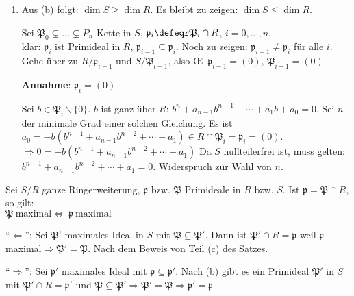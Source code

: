 \begin{Bew}
\begin{enumerate}
\item Aus (b) folgt: $\dim{S} \geq\dim{R}$. Es bleibt zu
zeigen: $\dim{S} \leq \dim{R}$.

Sei $\mathfrak{P}_0\subsetneq \ldots \subsetneq P_n$ Kette in $S$, 
$\mathfrak{p}_i\defeqr \mathfrak{P}_i\cap R$, $i=0,\ldots,n$.\\
klar: $\mathfrak{p}_i$ ist Primideal in $R$, $\mathfrak{p}_{i-1}\subseteq \mathfrak{p}_i$.
Noch zu zeigen: $\mathfrak{p}_{i-1}\neq \mathfrak{p}_i$ f\"ur alle $i$. Gehe \"uber zu
$R/\mathfrak{p}_{i-1}$ und $S/\mathfrak{P}_{i-1}$, also \OE\ $\mathfrak{p}_{i-1}=(0)$,
$\mathfrak{P}_{i-1}=(0)$.

\textbf{Annahme}: $\mathfrak{p}_i=(0)$

Sei $b\in \mathfrak{P}_{i}\backslash \{0\}$. $b$ ist ganz \"uber $R$: $b^n+a_{n-1}b^{n-1}+\cdots+a_1b+a_0=0$. Sei $n$ der minimale Grad einer solchen Gleichung.
Es ist $a_0=-b(b^{n-1}+a_{n-1}b^{n-2}+\cdots+a_1)\in R\cap \mathfrak{P}_i=\mathfrak{p}_i=(0)$.
$\Rightarrow 0=-b(b^{n-1}+a_{n-1}b^{n-2}+\cdots+a_1)$
Da $S$ nullteilerfrei ist, muss gelten: $b^{n-1}+a_{n-1}b^{n-2}+\cdots+a_1=0$. Widerspruch zur
Wahl von $n$.

\end{enumerate}
\end{Bew}

\begin{Folg}
\label{2.26}
Sei $S/R$ ganze Ringerweiterung, $\mathfrak{p}$ bzw. $\mathfrak{P}$ Primideale in $R$ bzw. $S$.
Ist $\mathfrak{p}=\mathfrak{P}\cap R$, so gilt:\\
$\mathfrak{P}\ \text{maximal} \Leftrightarrow\ \mathfrak{p}\ \text{maximal}$
\end{Folg}

\begin{Bew}
``$\Leftarrow$'': Sei $\mathfrak{P}'$ maximales Ideal in $S$ mit 
$\mathfrak{P}\subseteq \mathfrak P'$. Dann ist $\mathfrak{P}'\cap R=\mathfrak{p}$ weil
$\mathfrak{p}$ maximal$\Rightarrow\mathfrak{P'}=\mathfrak{P}$. Nach dem Beweis
von Teil (c) des Satzes.

``$\Rightarrow$'': Sei $\mathfrak{p}'$ maximales Ideal mit $\mathfrak{p}\subseteq \mathfrak{p'}$.
Nach (b) gibt es ein Primideal $\mathfrak{P}'$ in $S$ mit $\mathfrak{P}'\cap R=\mathfrak{p}'$
und $\mathfrak{P}\subseteq \mathfrak{P}'\Rightarrow \mathfrak{P'}=\mathfrak{P}\Rightarrow
\mathfrak{p}'=\mathfrak{p}$

\end{Bew}


